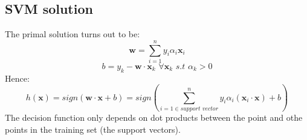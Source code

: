 \subsection{SVM solution}
The primal solution turns out to be:
\[\textbf{w} = \sum_{i=1}^{n}y_{i}\alpha_{i}\textbf{x}_{i}\]
\[b = y_{k} - \textbf{w} \cdot \textbf{x}_{k}\,\, \forall \textbf{x}_{k}\,\,s.t\,\, \alpha_{k} > 0\]
Hence:
\[h(\textbf{x}) = sign(\textbf{w} \cdot \textbf{x} + b) = sign\left(\sum_{i = 1 \in support \,\, vector}^{n}y_{i}\alpha_{i}(\textbf{x}_{i} \cdot \textbf{x}) + b\right)\]
The decision function only depends on dot products between the point and othe points in the training set (the support vectors).
